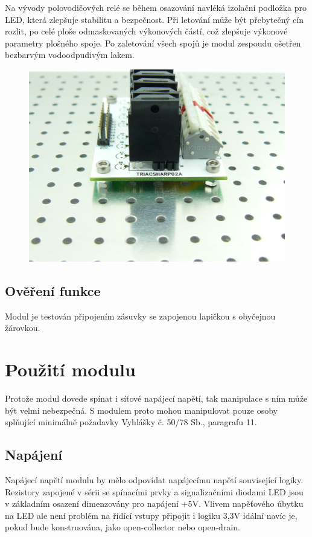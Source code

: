 \documentclass[12pt,a4paper,oneside]{article}
\begin{document}
Na vývody polovodičových relé se během osazování navléká izolační podložka pro LED, která zlepšuje stabilitu a bezpečnost.  Při letování může být přebytečný cín rozlit, po celé ploše odmaskovaných výkonových částí, což zlepšuje výkonové parametry plošného spoje.  Po zaletování všech spojů je modul zespoudu ošetřen bezbarvým vodoodpudivým lakem. 

\begin{figure} [htbp]
\centering
\includegraphics [width=130mm] {./img/TRIACSHARP02A_Big_Side.JPG} 
\end{figure}

\subsection{Ověření funkce}

Modul je testován připojením zásuvky se zapojenou lapičkou s obyčejnou žárovkou. 

\section{Použití modulu}

Protože modul dovede spínat i síťové napájecí napětí, tak manipulace s ním může být velmi nebezpečná. S modulem proto mohou manipulovat pouze osoby splňující minimálně požadavky Vyhlášky č. 50/78 Sb., paragrafu 11.

\subsection{Napájení}

Napájecí napětí modulu by mělo odpovídat napájecímu napětí související
logiky. Rezistory zapojené v sérii se spínacími prvky a signalizačními diodami LED jsou v základním osazení dimenzovány pro napájení +5V. Vlivem napěťového úbytku na LED ale není problém na řídící vstupy připojit i logiku 3,3V idální navíc je, pokud bude konstruována, jako open-collector nebo open-drain.
\end{document}

